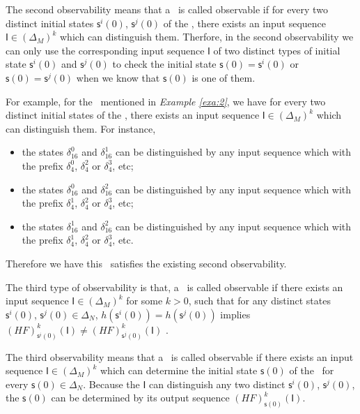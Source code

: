 The second observability means that a \BCN\ is called observable if for every two distinct initial states $\mathsf{s}^{i}(0)$, $\mathsf{s}^{j}(0)$ of the \BCN, there exists an input sequence $\mathsf{I}\in(\Delta_M)^k$ which can distinguish them. Therfore, in the second observability we can only use the corresponding input sequence $\mathsf{I}$ of two distinct types of initial state $\mathsf{s}^{i}(0)$ and $\mathsf{s}^{j}(0)$ to check the initial state $\mathsf{s}(0)=\mathsf{s}^{i}(0)$ or $\mathsf{s}(0)=\mathsf{s}^{j}(0)$ when we know that $\mathsf{s}(0)$ is one of them. 
\begin{example}
For example, for the \BCN\ mentioned in {\em Example \ref{exa:2}}, we have for every two distinct initial states of the \BCN, there exists an input sequence $\mathsf{I}\in(\Delta_M)^k$ which can distinguish them.  For instance,
\begin{itemize}
  \item the states $\delta_{16}^0$ and $\delta_{16}^1$ can be distinguished by any input sequence which with the prefix $\delta_{4}^0$, $\delta_{4}^2 $ or $\delta_{4}^3$, etc;
  \item the states $\delta_{16}^0$ and $\delta_{16}^2$  can be distinguished by any input sequence which with the prefix $\delta_{4}^1$, $\delta_{4}^2$ or $\delta_{4}^3$, etc;
  \item the states $\delta_{16}^1$ and $\delta_{16}^2$  can be distinguished by any input sequence which with the prefix $\delta_{4}^1$, $\delta_{4}^2$ or $\delta_{4}^3$, etc.
\end{itemize} 

Therefore we have this \BCN\ satisfies the existing second observability.
\label{exa:5}
\end{example}   
\begin{definition}
The third type of observability is that, a \BCN\ is called observable if there exists an input sequence $\mathsf{I}\in(\Delta_M)^k$ for some $k>0$, such that for any distinct states $\mathsf{s}^{i}(0)$, $\mathsf{s}^{j}(0) \in \Delta_N$, $h(\mathsf{s}^{i}(0))=h(\mathsf{s}^{j}(0))$ implies $(HF)^k_{\mathsf{s}^{i}(0)}(\mathsf{I})\neq (HF)^k_{\mathsf{s}^{j}(0)}(\mathsf{I})$ \cite{Cheng2011Identification}.
\end{definition}

The third observability means that a \BCN\ is called observable if there exists an input sequence $\mathsf{I}\in(\Delta_M)^k$ which can determine the initial state $\mathsf{s}(0)$ of the \BCN\ for every $\mathsf{s}(0)\in\Delta_N$. Because the $\mathsf{I}$ can distinguish any two distinct $\mathsf{s}^{i}(0)$, $\mathsf{s}^{j}(0)$, the $\mathsf{s}(0)$ can be determined by its output sequence $(HF)^k_{\mathsf{s}(0)}(\mathsf{I})$.

